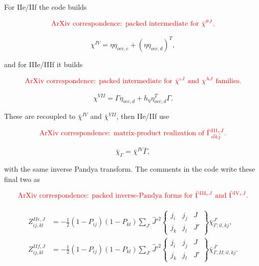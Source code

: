 \documentclass[
]{article}
\begin{document}
For IIe/IIf the code builds

\begin{equation}
{\color{red}\text{ArXiv correspondence: packed intermediate for }\bar\chi^{\theta J}.}
\end{equation}

\begin{equation}
\chi^{IV}=\eta\eta_{occ,c}+(\eta\eta_{occ,d})^T,
\end{equation}

and for IIIe/IIIf it builds

\begin{equation}
{\color{red}\text{ArXiv correspondence: packed intermediate for }\bar\chi^{\iota J}\text{ and }\chi^{\lambda J}\text{ families.}}
\end{equation}

\begin{equation}
\chi^{VII}=\Gamma\eta_{occ,d}+h_\eta\eta_{occ,d}^T\Gamma .
\end{equation}

These are recoupled to \(\bar\chi^{IV}\) and \(\bar\chi^{VII}\), then
IIe/IIf use

\begin{equation}
{\color{red}\text{ArXiv correspondence: matrix-product realization of }\bar\Gamma^{\mathrm{III}_cJ}_{i\bar l k\bar j}.}
\end{equation}

\begin{equation}
\bar\chi_\Gamma=\bar\chi^{IV}\bar\Gamma,
\end{equation}

with the same inverse Pandya transform. The comments in the code write
these final two as

\begin{equation}
{\color{red}\text{ArXiv correspondence: packed inverse-Pandya forms for }\bar\Gamma^{\mathrm{III}_cJ}\text{ and }\bar\Gamma^{\mathrm{IV}_cJ}.}
\end{equation}

\begin{equation}
\begin{aligned}
Z^{IIe,J}_{ij,kl}
&=-\frac12(1-P_{ij})(1-P_{kl})
\sum_{J'}\hat J'^2
\begin{Bmatrix} j_i&j_j&J\\ j_k&j_l&J'\end{Bmatrix}
\bar\chi_{\Gamma;il,kj}^{J'},\\
Z^{IIf,J}_{ij,kl}
&=-\frac12(1-P_{ij})(1-P_{kl})
\sum_{J'}\hat J'^2
\begin{Bmatrix} j_i&j_j&J\\ j_k&j_l&J'\end{Bmatrix}
\bar\chi_{\Gamma,II;il,kj}^{J'}.
\end{aligned}
\end{equation}
\end{document}
